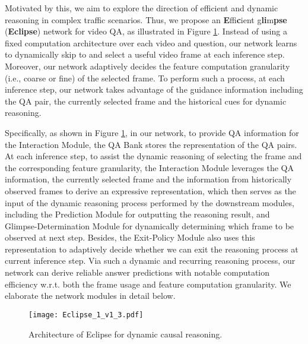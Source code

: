 \documentclass[final]{cvpr}
\begin{document}
Motivated by this, we aim to explore the direction of efficient and dynamic reasoning in complex traffic scenarios. Thus, we propose an \textbf{E}ffi\textbf{c}ient g\textbf{li}m\textbf{pse} (\textbf{Eclipse}) network for video QA, as illustrated in Figure \ref{fig:Eclipse}.
Instead of using a fixed computation architecture over each video and question, our network learns to dynamically skip to and select a useful video frame at each inference step. Moreover, our network adaptively decides the feature computation granularity (i.e., coarse or fine) of the selected frame. To perform such a process, at each inference step, our network takes advantage of the guidance information including the QA pair, the currently selected frame and the historical cues for dynamic reasoning.


Specifically, as shown in Figure \ref{fig:Eclipse},
in our network, to provide QA information for the Interaction Module, the QA Bank stores the representation of the QA pairs. 
At each inference step, to assist the dynamic reasoning of selecting the frame and the corresponding feature granularity, the Interaction Module leverages the QA information, the currently selected frame and the information from historically observed frames to derive an expressive representation, 
which then serves as the input of the dynamic reasoning process performed by the downstream modules, including the Prediction Module for outputting the reasoning result, and
Glimpse-Determination Module for dynamically determining which frame to be observed at next step. 
Besides, the Exit-Policy Module also uses this representation to adaptively decide whether we can exit the reasoning process at current inference step. 
Via such a dynamic and recurring reasoning process, our network can derive reliable answer predictions with notable computation efficiency w.r.t. both the frame usage and feature computation granularity. We elaborate the network modules in detail below.

\begin{figure}[tbp]
\begin{center}
    \texttt{[image: Eclipse\_1\_v1\_3.pdf]}
\end{center}
\vspace{-0.5cm}
\setlength\abovecaptionskip{-2cm}   
\setlength\belowcaptionskip{-2cm}
\caption{Architecture of Eclipse for dynamic causal reasoning.}
\label{fig:Eclipse}
\vspace{-0.4cm}
\end{figure}
\end{document}
